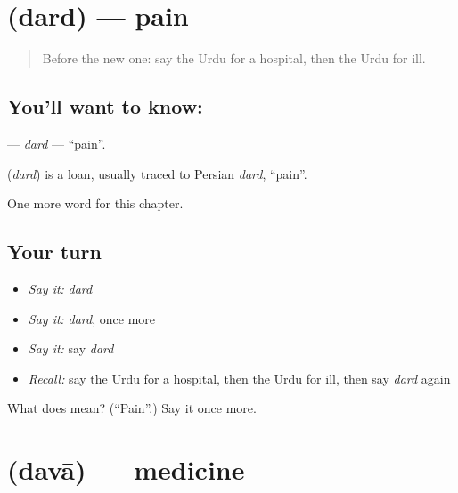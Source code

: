 \section[\texorpdfstring{\ur{درد} (dard)}{درد (dard)}]{ (dard) — pain}

\label{lesson:UR-C41-dard}



\begin{quote}
Before the new one: say the Urdu for a hospital, then the Urdu for ill.
\end{quote}

\subsection*{You'll want to know: }
\textbf{} — \emph{dard} — \textquotedblleft{}pain\textquotedblright{}.

\begin{cousinweb}
\textbf{} (\emph{dard}) is a loan, usually traced to Persian \emph{dard}, \textquotedblleft{}pain\textquotedblright{}.
\end{cousinweb}

\begin{grammarlens}[title={What you've built}]
One more word for this chapter.
\end{grammarlens}

\subsection*{Your turn}
\begin{itemize}
\raggedright
  \item \emph{Say it:} \emph{dard}
  \item \emph{Say it:} \emph{dard}, once more
  \item \emph{Say it:} say \emph{dard}
  \item \emph{Recall:} say the Urdu for a hospital, then the Urdu for ill, then say \emph{dard} again
\end{itemize}

\begin{tcolorbox}[breakable,colback=teal!4,colframe=teal!35!black,title={Before you move on}]
What does  mean? (\textquotedblleft{}Pain\textquotedblright{}.) Say it once more.
\end{tcolorbox}
\section[\texorpdfstring{\ur{دوا} (davā)}{دوا (davā)}]{ (davā) — medicine}

